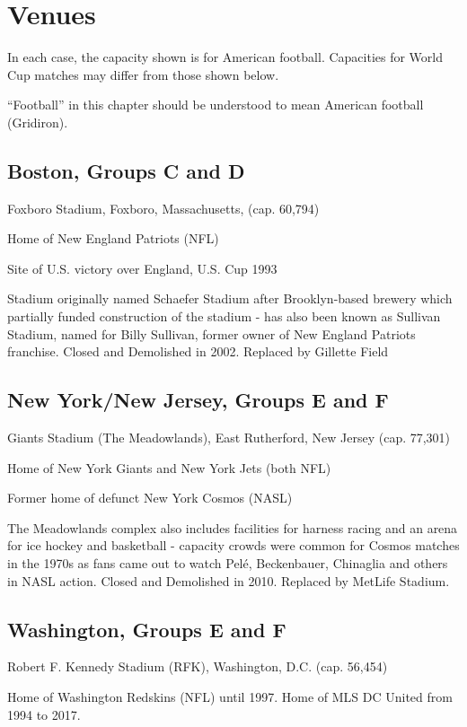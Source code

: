 \chapter{Venues}
\newline
\newline


In each case, the capacity shown is for American football. Capacities for World
Cup matches may differ from those shown below.

``Football'' in this chapter should be understood to mean American football (Gridiron).

\section{Boston, Groups C and D}
Foxboro Stadium, Foxboro, Massachusetts, (cap. 60,794)

Home of New England Patriots (NFL)

Site of U.S. victory over England, U.S. Cup 1993

Stadium originally named Schaefer Stadium after Brooklyn-based brewery which 
partially funded construction of the stadium - has also been known as Sullivan
Stadium, named for Billy Sullivan, former owner of New England Patriots 
franchise.  Closed and Demolished in 2002.   Replaced by Gillette Field
\section{New York/New Jersey, Groups E and F}
Giants Stadium (The Meadowlands), East Rutherford, New Jersey (cap. 77,301)

Home of New York Giants and New York Jets (both NFL)

Former home of defunct New York Cosmos (NASL)

The Meadowlands complex also includes facilities for harness racing and an 
arena for ice hockey and basketball - capacity crowds were common for Cosmos 
matches in the 1970s as fans came out to watch Pel{\'e}, Beckenbauer, Chinaglia and
others in NASL action.  Closed and Demolished in 2010.  Replaced by MetLife Stadium.
\section{Washington, Groups E and F}
Robert F. Kennedy Stadium (RFK), Washington, D.C. (cap. 56,454)

Home of Washington Redskins (NFL) until 1997.  Home of MLS DC United from 1994 to 2017.

